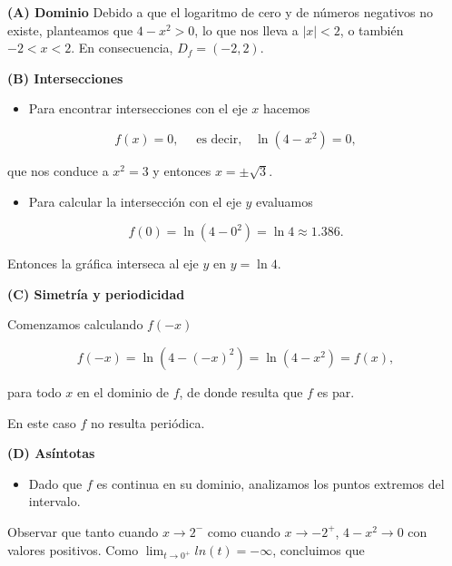\documentclass[
  letterpaper,
]{book}
\providecommand{\tightlist}{%
  \setlength{\itemsep}{0pt}\setlength{\parskip}{0pt}}
\theoremstyle{plain}
\theoremstyle{remark}
\begin{document}
\begin{tcolorbox}[enhanced jigsaw, opacityback=0, left=2mm, opacitybacktitle=0.6, toprule=.15mm, bottomrule=.15mm, colbacktitle=quarto-callout-tip-color!10!white, titlerule=0mm, bottomtitle=1mm, title=\textcolor{quarto-callout-tip-color}{\faLightbulb}\hspace{0.5em}{Solución}, toptitle=1mm, colframe=quarto-callout-tip-color-frame, colback=white, breakable, rightrule=.15mm, arc=.35mm, leftrule=.75mm, coltitle=black]

\textbf{(A) Dominio} Debido a que el logaritmo de cero y de números
negativos no existe, planteamos que \(4-x^2>0\), lo que nos lleva a
\(|x|<2\), o también \(-2<x<2\). En consecuencia, \(D_f=(-2,2)\).

\textbf{(B) Intersecciones}

\begin{itemize}
\tightlist
\item
  Para encontrar intersecciones con el eje \(x\) hacemos
\end{itemize}

\[
f(x)=0, \quad \text{ es decir,} \quad \ln(4-x^2)=0,
\]

que nos conduce a \(x^2=3\) y entonces \(x=\pm \sqrt{3}\).

\begin{itemize}
\tightlist
\item
  Para calcular la intersección con el eje \(y\) evaluamos
\end{itemize}

\[
f(0)=\ln(4-0^2)=\ln 4\approx 1.386.
\]

Entonces la gráfica interseca al eje \(y\) en \(y=\ln 4\).

\textbf{(C) Simetría y periodicidad}

Comenzamos calculando \(f(-x)\)

\[
f(-x)=\ln(4-(-x)^2)=\ln(4-x^2)=f(x),
\]

para todo \(x\) en el dominio de \(f\), de donde resulta que \(f\) es
par.

En este caso \(f\) no resulta periódica.

\textbf{(D) Asíntotas}

\begin{itemize}
\tightlist
\item
  Dado que \(f\) es continua en su dominio, analizamos los puntos
  extremos del intervalo.
\end{itemize}

Observar que tanto cuando \(x\to 2^-\) como cuando \(x\to -2^+\),
\(4-x^2\to 0\) con valores positivos. Como
\(\lim_{t\to 0^+} ln(t)=-\infty\), concluimos que


\end{tcolorbox}
\end{document}
